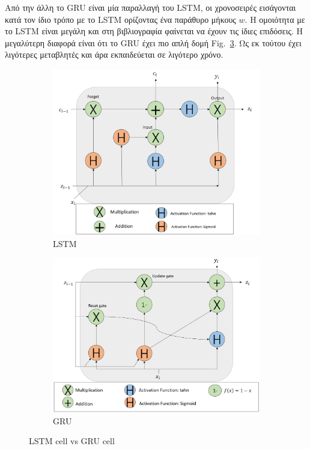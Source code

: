 \documentclass[a4paper,12pt]{report}
\theoremstyle{definitionNODot}
\begin{document}
\begin{itemize}
		Από την άλλη το GRU είναι μία παραλλαγή του LSTM, οι χρονοσειρές εισάγονται κατά τον ίδιο τρόπο με το LSTM ορίζοντας ένα παράθυρο μήκους $w$. Η ομοιότητα με το LSTM είναι μεγάλη και στη βιβλιογραφία φαίνεται να έχουν τις ίδιες επιδόσεις. Η μεγαλύτερη διαφορά είναι ότι το GRU έχει πιο απλή δομή Fig.~\ref{fig:lstmgrucomparison}. Ως εκ τούτου έχει λιγότερες μεταβλητές και άρα εκπαιδεύεται σε λιγότερο χρόνο.
		
		\begin{figure}[h]
			\centering
			\begin{subfigure}[b]{0.8\textwidth}
				\centering
				\includegraphics[width=\textwidth]{lstmarchitecture2.png}
				\caption{LSTM}
				\label{fig:lstmarchitecturecell}
			\end{subfigure}
			\hfill
			\begin{subfigure}[b]{0.8\textwidth}
				\centering
				\includegraphics[width=\textwidth]{gruarchitecture2.png}
				\caption{GRU}
				\label{fig:gruarchitecturecell}
			\end{subfigure}
			\caption{LSTM cell vs GRU cell}
			\label{fig:lstmgrucomparison}
		\end{figure}
		
	\end{itemize}
	
\end{document}
